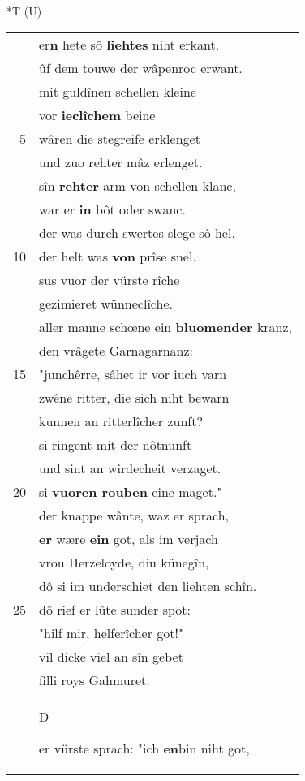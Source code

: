 \documentclass[8pt,a4paper,notitlepage]{article}
\begin{document}
\begin{table}[ht]
\hspace{0.5cm}
\begin{minipage}[t]{0.5\linewidth}
\small
\begin{center}*T (U)
\end{center}
\begin{tabular}{rl}
 & er\textbf{n} hete sô \textbf{liehtes} niht erkant.\\ 
 & ûf dem touwe der wâpenroc erwant.\\ 
 & mit guldînen schellen kleine\\ 
 & vor \textbf{ieclîchem} beine\\ 
5 & wâren die stegreife erklenget\\ 
 & und zuo rehter mâz erlenget.\\ 
 & sîn \textbf{rehter} arm von schellen klanc,\\ 
 & war er \textbf{in} bôt oder swanc.\\ 
 & der was durch swertes slege sô hel.\\ 
10 & der helt was \textbf{von} prîse snel.\\ 
 & sus vuor der vürste rîche\\ 
 & gezimieret wünneclîche.\\ 
 & aller manne schœne ein \textbf{bluomender} kranz,\\ 
 & den vrâgete Garnagarnanz:\\ 
15 & "junchêrre, sâhet ir vor iuch varn\\ 
 & zwêne ritter, die sich niht bewarn\\ 
 & kunnen an ritterlîcher zunft?\\ 
 & si ringent mit der nôtnunft\\ 
 & und sint an wirdecheit verzaget.\\ 
20 & si \textbf{vuoren rouben} eine maget."\\ 
 & der knappe wânte, waz er sprach,\\ 
 & \textbf{er} wære \textbf{ein} got, als im verjach\\ 
 & vrou Herzeloyde, diu künegîn,\\ 
 & dô si im underschiet den liehten schîn.\\ 
25 & dô rief er lûte sunder spot:\\ 
 & "hilf mir, helferîcher got!"\\ 
 & vil dicke viel an sîn gebet\\ 
 & filli roys Gahmuret.\\ 
 & \begin{large}D\end{large}er vürste sprach: "ich \textbf{en}bin niht got,\\ 

\end{tabular}
\end{minipage}
\end{table}
\end{document}
